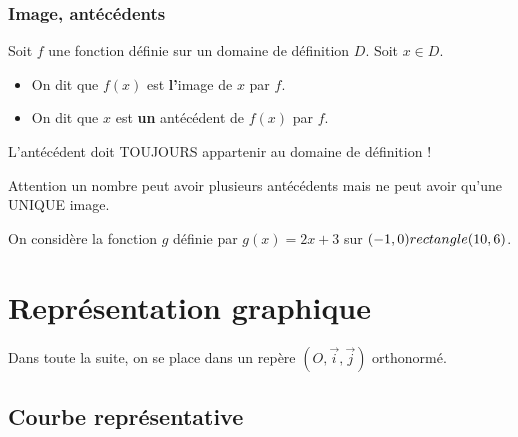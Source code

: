 \subsubsection{Image, antécédents}

\begin{Définition} 
Soit $f$ une fonction définie sur un domaine de définition $D$. Soit $x \in D$.

\begin{itemize}[label=\textcolor{Couleur6}{$\bullet$}]
    \item On dit que $f(x)$ est \textbf{l'}image de $x$ par $f$.
    \item On dit que $x$ est \textbf{un} antécédent de $f(x)$ par $f$.
\end{itemize}
\end{Définition}

L'antécédent doit TOUJOURS appartenir au domaine de définition !
\vspace{0.5cm}
\begin{Remarque}
Attention un nombre peut avoir plusieurs antécédents mais ne peut avoir qu'une UNIQUE image.
\end{Remarque}
\vspace{0.5cm}
\begin{Exemple}
\vspace{0.1cm} 
\ligne

\ligne

\end{Exemple}

\begin{Exemple}
On considère la fonction $g$ définie par $g(x) = 2x + 3$ sur $(-1,0) rectangle (10,6)$.
\vspace{0.1cm} 
\ligne

\ligne

\ligne

\ligne

\ligne

\ligne

\end{Exemple}

\newpage

\section{Représentation graphique}

Dans toute la suite, on se place dans un repère $(O, \overrightarrow{i}, \overrightarrow{j})$ orthonormé.

\subsection{Courbe représentative}

